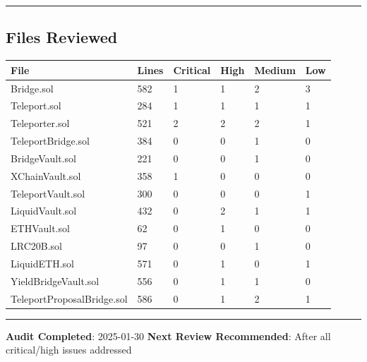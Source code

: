 \documentclass[
]{article}
\newcounter{none} %
\begin{document}
\begin{center}\rule{0.5\linewidth}{0.5pt}\end{center}

\subsection{Files Reviewed}\label{files-reviewed}

{\def\LTcaptype{none} %
\begin{longtable}[]{@{}llllll@{}}
\toprule\noalign{}
File & Lines & Critical & High & Medium & Low \\
\midrule\noalign{}
\endhead
\bottomrule\noalign{}
\endlastfoot
Bridge.sol & 582 & 1 & 1 & 2 & 3 \\
Teleport.sol & 284 & 1 & 1 & 1 & 1 \\
Teleporter.sol & 521 & 2 & 2 & 2 & 1 \\
TeleportBridge.sol & 384 & 0 & 0 & 1 & 0 \\
BridgeVault.sol & 221 & 0 & 0 & 1 & 0 \\
XChainVault.sol & 358 & 1 & 0 & 0 & 0 \\
TeleportVault.sol & 300 & 0 & 0 & 0 & 1 \\
LiquidVault.sol & 432 & 0 & 2 & 1 & 1 \\
ETHVault.sol & 62 & 0 & 1 & 0 & 0 \\
LRC20B.sol & 97 & 0 & 0 & 1 & 0 \\
LiquidETH.sol & 571 & 0 & 1 & 0 & 1 \\
YieldBridgeVault.sol & 556 & 0 & 1 & 1 & 0 \\
TeleportProposalBridge.sol & 586 & 0 & 1 & 2 & 1 \\
\end{longtable}
}

\begin{center}\rule{0.5\linewidth}{0.5pt}\end{center}

\textbf{Audit Completed}: 2025-01-30 \textbf{Next Review Recommended}:
After all critical/high issues addressed
\end{document}
